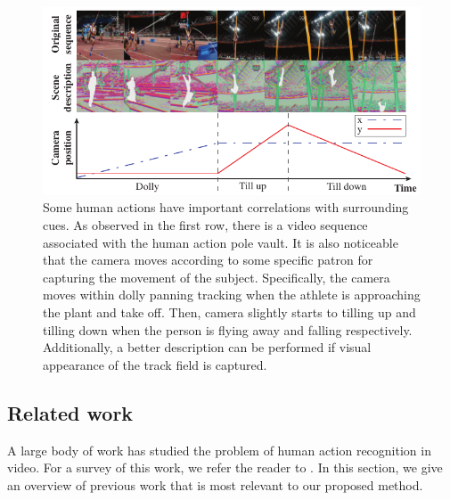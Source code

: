 \begin{figure}[ht]
\begin{center}
\includegraphics[width=0.98\linewidth]{fig/PullFigure.pdf}
\end{center}
\caption{Some human actions have important correlations with surrounding cues. As observed in the first row, there is a video sequence associated with the human action pole vault. It is also noticeable that the camera moves according to some specific patron for capturing the movement of the subject. Specifically, the camera moves within dolly panning tracking when the athlete is approaching the plant and take off. Then, camera slightly starts to tilling up and tilling down when the person is flying away and falling respectively. Additionally, a better description can be performed if visual appearance of the track field is captured.}
\label{fig:pull_figure}
\end{figure}



\subsection*{Related work}\label{subsec: related work}
A large body of work has studied the problem of human action recognition in video. For a survey of this work, we refer the reader to \cite{aggarwal2011}. In this section, we give an overview of previous work that is most relevant to our proposed method.


